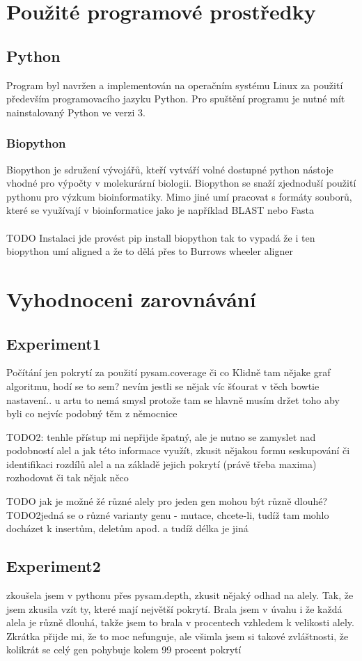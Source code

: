 \documentclass[czech,DP]{thesiskiv}
\numberwithin{equation}{section}
\begin{document}
\section{Použité programové prostředky}
\subsection{Python}
Program byl navržen a implementován na operačním systému Linux za použití především programovacího jazyku Python. 
 Pro spuštění programu je nutné mít nainstalovaný Python ve verzi 3.
\subsubsection{Biopython}
Biopython je sdružení vývojářů, kteří vytváří volné dostupné python nástoje vhodné pro výpočty v molekurární biologii. Biopython se snaží zjednoduší použití pythonu pro výzkum bioinformatiky. Mimo jiné umí pracovat s formáty souborů, které se využívají v bioinformatice jako je například BLAST nebo Fasta   
\\
\\
TODO
Instalaci jde provést pip install biopython
tak to vypadá že i ten biopython umí aligned a že to dělá přes to Burrows wheeler aligner 

\section{Vyhodnoceni zarovnávání}
\subsection{Experiment1}
	Počítání jen pokrytí za použití pysam.coverage či co 
	Klidně tam nějake graf algoritmu, hodí se to sem? 
	nevím jestli se nějak víc šťourat v těch bowtie nastavení.. u artu to nemá smysl protože tam se hlavně musím držet toho aby byli co nejvíc podobný těm z němocnice
	
TODO2: tenhle přístup mi nepřijde špatný, ale je nutno se zamyslet nad podobností alel a jak této informace využít, zkusit nějakou formu seskupování či identifikaci rozdílů alel a na základě jejich pokrytí (právě třeba maxima) rozhodovat či tak nějak něco

TODO jak je možné žé různé alely pro jeden gen mohou být různě dlouhé?
TODO2jedná se o různé varianty genu - mutace, chcete-li, tudíž tam mohlo docházet k insertům, deletům apod. a tudíž délka je jiná

\subsection{Experiment2}
zkoušela jsem v pythonu přes pysam.depth, zkusit nějaký odhad na alely. Tak, že jsem zkusila vzít ty, které mají největší pokrytí. Brala jsem v úvahu i že každá alela je různě dlouhá, takže jsem to brala v procentech vzhledem k velikosti alely.  Zkrátka přijde mi, že to moc nefunguje, ale všimla jsem si takové zvláštnosti, že kolikrát se celý gen pohybuje kolem 99 procent pokrytí
\end{document}
